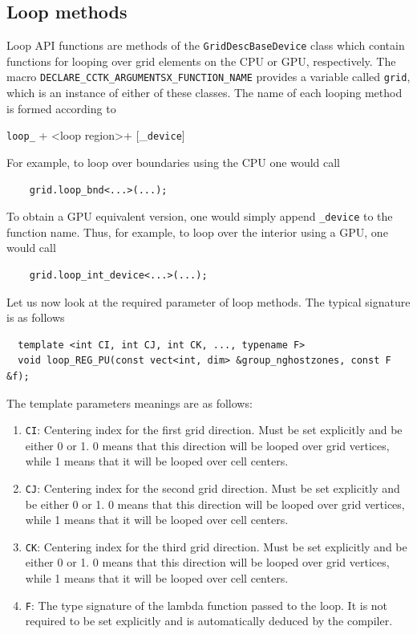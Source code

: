 
\subsection{Loop methods}
\label{sec:loop_methods}

Loop API functions are methods of the \texttt{GridDescBaseDevice} class which contain functions for looping over grid elements on the CPU or GPU, respectively. The macro \texttt{DECLARE\_CCTK\_ARGUMENTSX\_FUNCTION\_NAME} provides a variable called \texttt{grid}, which is an instance of either of these classes. The name of each looping method is formed according to
%
\begin{center}
    \texttt{loop\_} + \textless loop region\textgreater + [\_\texttt{device}]
\end{center}

For example, to loop over boundaries using the CPU one would call
%
\begin{verbatim}
    grid.loop_bnd<...>(...);
\end{verbatim}
%
To obtain a GPU equivalent version, one would simply append \texttt{\_device} to the function name. Thus, for example, to loop over the interior using a GPU, one would call 

\begin{verbatim}
    grid.loop_int_device<...>(...);
\end{verbatim}

Let us now look at the required parameter of loop methods. The typical signature is as follows

\begin{verbatim}
  template <int CI, int CJ, int CK, ..., typename F>
  void loop_REG_PU(const vect<int, dim> &group_nghostzones, const F &f);
\end{verbatim}

The template parameters meanings are as follows:

\begin{enumerate}
  \item \texttt{CI}: Centering index for the first grid direction. Must be set explicitly and be either 0 or 1. 0 means that this direction will be looped over grid vertices, while 1 means that it will be looped over cell centers.
  \item \texttt{CJ}: Centering index for the second grid direction. Must be set explicitly and be either 0 or 1. 0 means that this direction will be looped over grid vertices, while 1 means that it will be looped over cell centers.
  \item \texttt{CK}: Centering index for the third grid direction. Must be set explicitly and be either 0 or 1. 0 means that this direction will be looped over grid vertices, while 1 means that it will be looped over cell centers.
  \item \texttt{F}: The type signature of the lambda function passed to the loop. It is not required to be set explicitly and is automatically deduced by the compiler.
\end{enumerate}

